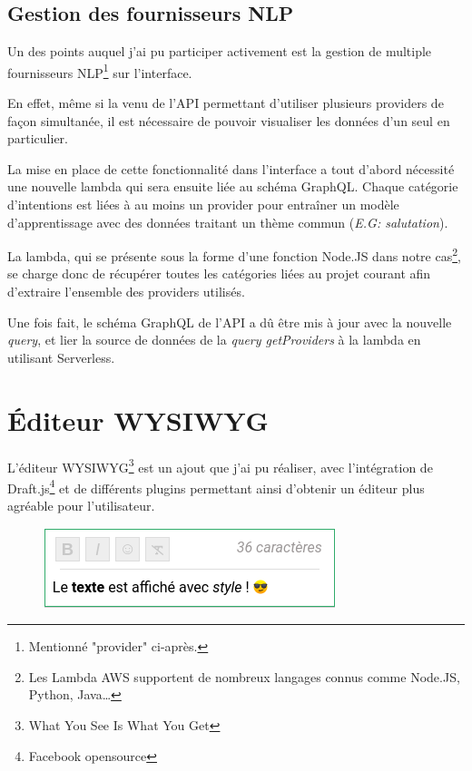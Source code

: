 \documentclass[12pt,a4paper,oneside]{scrreprt}
\begin{document}
\subsection{Gestion des fournisseurs NLP}

Un des points auquel j'ai pu participer activement est la gestion de multiple fournisseurs NLP\footnote{Mentionné "provider" ci-après.} sur l'interface.

En effet, même si la venu de l'API permettant d'utiliser plusieurs providers de façon simultanée, il est nécessaire de pouvoir visualiser les données d'un seul en particulier.

La mise en place de cette fonctionnalité dans l'interface a tout d'abord nécessité une nouvelle lambda qui sera ensuite liée au schéma GraphQL. Chaque catégorie d'intentions est liées à au moins un provider pour entraîner un modèle d'apprentissage avec des données traitant un thème commun (\textit{E.G: salutation}).

La lambda, qui se présente sous la forme d'une fonction Node.JS dans notre cas\footnote{Les Lambda AWS supportent de nombreux langages connus comme Node.JS, Python, Java\dots}, se charge donc de récupérer toutes les catégories liées au projet courant afin d'extraire l'ensemble des providers utilisés.

Une fois fait, le schéma GraphQL de l'API a dû être mis à jour avec la nouvelle \textit{query}, et lier la source de données de la \textit{query getProviders} à la lambda en utilisant Serverless.

\section{Éditeur WYSIWYG}

L'éditeur WYSIWYG\footnote{What You See Is What You Get} est un ajout que j'ai pu réaliser, avec l'intégration de Draft.js\footnote{Facebook opensource} et de différents plugins permettant ainsi d'obtenir un éditeur plus agréable pour l'utilisateur.

\begin{figure}[!ht]
	\centering
	\includegraphics[scale=0.75]{pictures/wysiwyg.png}
\end{figure}
\end{document}
